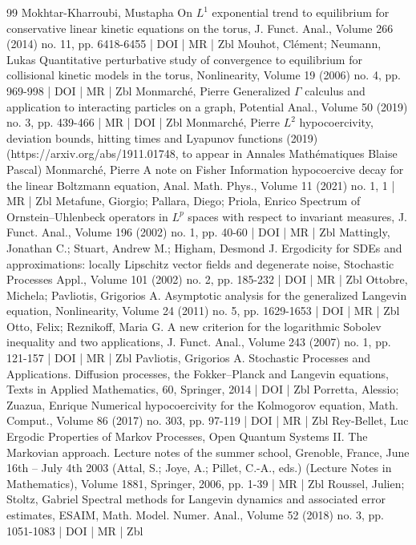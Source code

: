 \documentclass[10pt]{amsart}
\theoremstyle{definition}\newtheorem{defi}[theo]{Definition}\newtheorem{rema}[theo]{Remark}\newtheorem{exam}[theo]{Example}\newtheorem{exem}[theo]{Example}\newtheorem{nota}[theo]{Notation}
\begin{document}
\begin{thebibliography}{99}
Mokhtar-Kharroubi, Mustapha On ${L}^{1}$ exponential trend to equilibrium for conservative linear kinetic equations on the torus, J. Funct. Anal., Volume 266 (2014) no. 11, pp. 6418-6455 | DOI | MR | Zbl
Mouhot, Clément; Neumann, Lukas Quantitative perturbative study of convergence to equilibrium for collisional kinetic models in the torus, Nonlinearity, Volume 19 (2006) no. 4, pp. 969-998 | DOI | MR | Zbl
Monmarché, Pierre Generalized $\Gamma $ calculus and application to interacting particles on a graph, Potential Anal., Volume 50 (2019) no. 3, pp. 439-466 | MR | DOI | Zbl
Monmarché, Pierre ${L}^2$ hypocoercivity, deviation bounds, hitting times and Lyapunov functions (2019) (https://arxiv.org/abs/1911.01748, to appear in Annales Mathématiques Blaise Pascal)
Monmarché, Pierre A note on Fisher Information hypocoercive decay for the linear Boltzmann equation, Anal. Math. Phys., Volume 11 (2021) no. 1, 1 | MR | Zbl
Metafune, Giorgio; Pallara, Diego; Priola, Enrico Spectrum of Ornstein–Uhlenbeck operators in ${L}^p$ spaces with respect to invariant measures, J. Funct. Anal., Volume 196 (2002) no. 1, pp. 40-60 | DOI | MR | Zbl
Mattingly, Jonathan C.; Stuart, Andrew M.; Higham, Desmond J. Ergodicity for SDEs and approximations: locally Lipschitz vector fields and degenerate noise, Stochastic Processes Appl., Volume 101 (2002) no. 2, pp. 185-232 | DOI | MR | Zbl
Ottobre, Michela; Pavliotis, Grigorios A. Asymptotic analysis for the generalized Langevin equation, Nonlinearity, Volume 24 (2011) no. 5, pp. 1629-1653 | DOI | MR | Zbl
Otto, Felix; Reznikoff, Maria G. A new criterion for the logarithmic Sobolev inequality and two applications, J. Funct. Anal., Volume 243 (2007) no. 1, pp. 121-157 | DOI | MR | Zbl
Pavliotis, Grigorios A. Stochastic Processes and Applications. Diffusion processes, the Fokker–Planck and Langevin equations, Texts in Applied Mathematics, 60, Springer, 2014 | DOI | Zbl
Porretta, Alessio; Zuazua, Enrique Numerical hypocoercivity for the Kolmogorov equation, Math. Comput., Volume 86 (2017) no. 303, pp. 97-119 | DOI | MR | Zbl
Rey-Bellet, Luc Ergodic Properties of Markov Processes, Open Quantum Systems II. The Markovian approach. Lecture notes of the summer school, Grenoble, France, June 16th – July 4th 2003 (Attal, S.; Joye, A.; Pillet, C.-A., eds.) (Lecture Notes in Mathematics), Volume 1881, Springer, 2006, pp. 1-39 | MR | Zbl
Roussel, Julien; Stoltz, Gabriel Spectral methods for Langevin dynamics and associated error estimates, ESAIM, Math. Model. Numer. Anal., Volume 52 (2018) no. 3, pp. 1051-1083 | DOI | MR | Zbl

\end{thebibliography}
\end{document}
